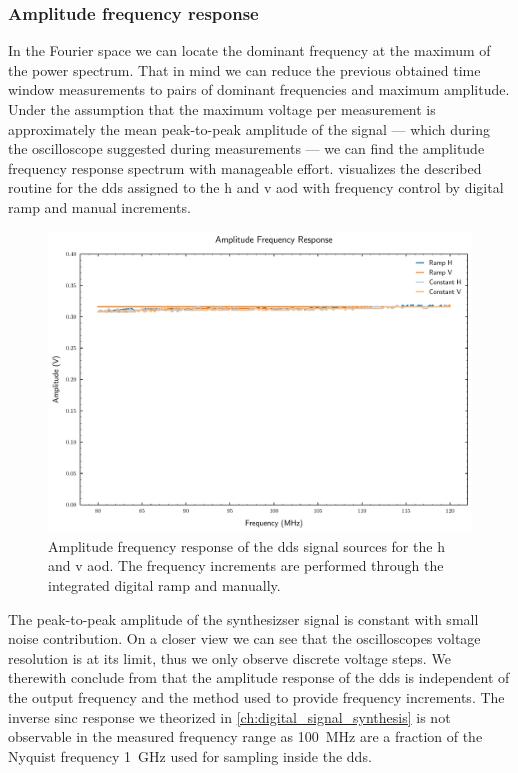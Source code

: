 \subsubsection{Amplitude frequency response}

In the Fourier space we can locate the dominant frequency at the maximum of
the power spectrum. That in mind we can reduce the previous obtained time
window measurements to pairs of dominant frequencies and maximum amplitude.
Under the assumption that the maximum voltage per measurement is approximately
the mean peak-to-peak amplitude of the signal --- which during the
oscilloscope suggested during measurements --- we can find the amplitude
frequency response spectrum with manageable effort.
 visualizes the described routine for the
\gls{dds} assigned to the \gls{h} and \gls{v} \gls{aod} with frequency control
by digital ramp and manual increments.
\begin{figure}[htb]
  \centering
  \includegraphics[width=.9\textwidth]{../figure/signal/synthesis/response.pdf}
  \caption{Amplitude frequency response of the \gls{dds} signal sources for
    the \gls{h} and \gls{v} \gls{aod}. The frequency increments
    are performed through the integrated digital ramp and manually.
  }\label{fig:signal_synthesis_response}
\end{figure}
The peak-to-peak amplitude of the synthesizser signal is constant with small
noise contribution. On a closer view we can see that the oscilloscopes voltage
resolution is at its limit, thus we only observe discrete voltage steps.
We therewith conclude from  that the
amplitude response of the \gls{dds} is independent of the output frequency
and the method used to provide frequency increments. The inverse sinc response
we theorized in \cref{ch:digital_signal_synthesis} is not observable in the
measured frequency range as \SI{100}{\mega\hertz} are a fraction of the
Nyquist frequency \SI{1}{\giga\hertz} used for sampling inside the \gls{dds}.

